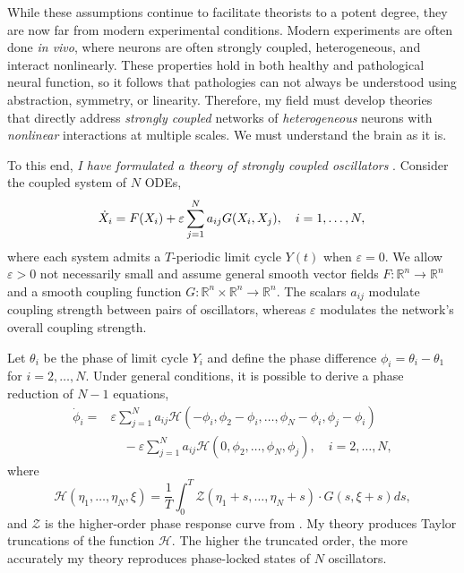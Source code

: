 \documentclass[a4paper,11pt]{article}
\newcommand{\ve}{\varepsilon}
\newcommand{\h}{\mathcal{H}}
\begin{document}
	While these assumptions continue to facilitate theorists to a potent degree, they are now far from modern experimental conditions. Modern experiments are often done \textit{in vivo}, where neurons are often strongly coupled, heterogeneous, and interact nonlinearly. These properties hold in both healthy and pathological neural function, so it follows that pathologies can not always be understood using abstraction, symmetry, or linearity. Therefore, my field must develop theories that directly address \textit{strongly coupled} networks of \textit{heterogeneous} neurons with \textit{nonlinear} interactions at multiple scales. We must understand the brain as it is.
	
	To this end, \textit{I have formulated a theory of strongly coupled oscillators} \cite{park2020high}. Consider the coupled system of $N$ ODEs,
	\begin{equation}\label{eq:odes}
		\dot X_i = F(X_i) +\ve \sum_{j=1}^N a_{ij} G(X_i,X_j), \quad i=1,\ldots,N,\\
	\end{equation}
	where each system admits a $T$-periodic limit cycle $Y(t)$ when $\ve=0$. We allow $\ve>0$ not necessarily small and assume general smooth vector fields $F:\mathbb{R}^n \rightarrow \mathbb{R}^n$ and a smooth coupling function $G:\mathbb{R}^n\times\mathbb{R}^n\rightarrow \mathbb{R}^n$. The scalars $a_{ij}$ modulate coupling strength between pairs of oscillators, whereas $\ve$ modulates the network's overall coupling strength.
	
	Let $\theta_i$ be the phase of limit cycle $Y_i$ and define the phase difference $\phi_i=\theta_i-\theta_1$ for $i=2,\ldots,N$. Under general conditions, it is possible to derive a phase reduction of $N-1$ equations,
	\begin{align*}
		\dot \phi_i =& \ve\sum_{j=1}^N a_{ij} \h(-\phi_i,\phi_2-\phi_i,\ldots,\phi_N-\phi_i,\phi_j-\phi_i)\\
		&\quad- \ve\sum_{j=1}^N a_{ij} \h(0,\phi_2,\ldots,\phi_N,\phi_j), \quad i=2,\ldots,N,
	\end{align*}
	where
	\begin{equation*}
		\h(\eta_1,\ldots,\eta_N,\xi) = \frac{1}{T} \int_0^T \mathcal{Z}(\eta_1+s,\ldots,\eta_N+s) \cdot G(s,\xi+s)ds,
	\end{equation*}
	and $\mathcal{Z}$ is the higher-order phase response curve from \cite{wilson2020phase}. My theory produces Taylor truncations of the function $\h$. The higher the truncated order, the more accurately my theory reproduces phase-locked states of $N$ oscillators.
	
\end{document}
